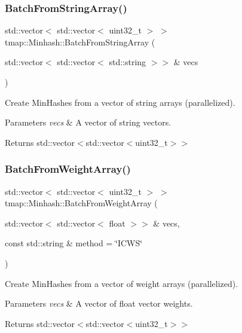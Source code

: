 \subsubsection{\texorpdfstring{Batch\+From\+String\+Array()}{BatchFromStringArray()}}
{\footnotesize\ttfamily std\+::vector$<$ std\+::vector$<$ uint32\+\_\+t $>$ $>$ tmap\+::\+Minhash\+::\+Batch\+From\+String\+Array (\begin{DoxyParamCaption}\item[{std\+::vector$<$ std\+::vector$<$ std\+::string $>$$>$ \&}]{vecs }\end{DoxyParamCaption})}



Create Min\+Hashes from a vector of string arrays (parallelized). 


\begin{DoxyParams}{Parameters}
{\em vecs} & A vector of string vectors. \\
\hline
\end{DoxyParams}
\begin{DoxyReturn}{Returns}
std\+::vector$<$std\+::vector$<$uint32\+\_\+t$>$$>$ 
\end{DoxyReturn}
\mbox{\label{classtmap_1_1Minhash_a8fe5c588003e8a3089d0a04df7b0f6e9}} 
\subsubsection{\texorpdfstring{Batch\+From\+Weight\+Array()}{BatchFromWeightArray()}}
{\footnotesize\ttfamily std\+::vector$<$ std\+::vector$<$ uint32\+\_\+t $>$ $>$ tmap\+::\+Minhash\+::\+Batch\+From\+Weight\+Array (\begin{DoxyParamCaption}\item[{std\+::vector$<$ std\+::vector$<$ float $>$$>$ \&}]{vecs,  }\item[{const std\+::string \&}]{method = {\ttfamily \char`\"{}ICWS\char`\"{}} }\end{DoxyParamCaption})}



Create Min\+Hashes from a vector of weight arrays (parallelized). 


\begin{DoxyParams}{Parameters}
{\em vecs} & A vector of float vector weights. \\
\hline
\end{DoxyParams}
\begin{DoxyReturn}{Returns}
std\+::vector$<$std\+::vector$<$uint32\+\_\+t$>$$>$ 
\end{DoxyReturn}
\mbox{\label{classtmap_1_1Minhash_a5419c90e01785149b570f94308e82430}} 
